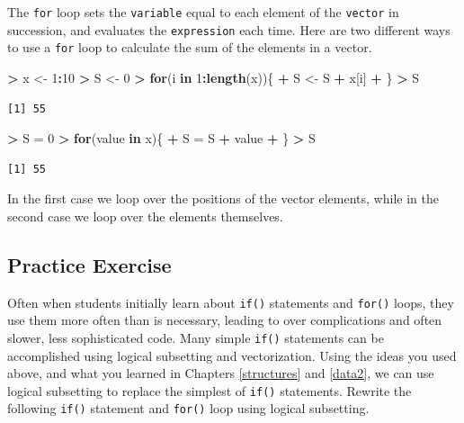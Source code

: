 \documentclass[]{krantz}
\makeatletter
\newenvironment{Shaded}{\begin{snugshade}}{\end{snugshade}}
\newcommand{\KeywordTok}[1]{\textcolor[rgb]{0.27,0.27,0.27}{\textbf{#1}}}
\newcommand{\DecValTok}[1]{\textcolor[rgb]{0.06,0.06,0.06}{#1}}
\newcommand{\StringTok}[1]{\textcolor[rgb]{0.5,0.5,0.5}{#1}}
\newcommand{\ControlFlowTok}[1]{\textcolor[rgb]{0.27,0.27,0.27}{\textbf{#1}}}
\newcommand{\OperatorTok}[1]{\textcolor[rgb]{0.43,0.43,0.43}{\textbf{#1}}}
\newcommand{\NormalTok}[1]{#1}
\newenvironment{kframe}{%
\medskip{}
\setlength{\fboxsep}{.8em}
 \def\at@end@of@kframe{}%
 \ifinner\ifhmode%
  \def\at@end@of@kframe{\end{minipage}}%
  \begin{minipage}{\columnwidth}%
 \fi\fi%
 \def\FrameCommand##1{\hskip\@totalleftmargin \hskip-\fboxsep
 \colorbox{shadecolor}{##1}\hskip-\fboxsep
     \hskip-\linewidth \hskip-\@totalleftmargin \hskip\columnwidth}%
 \MakeFramed {\advance\hsize-\width
   \@totalleftmargin\z@ \linewidth\hsize
   \@setminipage}}%
 {\par\unskip\endMakeFramed%
 \at@end@of@kframe}
\renewenvironment{Shaded}{\begin{kframe}}{\end{kframe}}
\makeatother
\begin{document}
The \texttt{for} loop sets the \texttt{variable} equal to each element
of the \texttt{vector} in succession, and evaluates the
\texttt{expression} each time. Here are two different ways to use a
\texttt{for} loop to calculate the sum of the elements in a vector.

\begin{Shaded}
\begin{Highlighting}[]
\OperatorTok{>}\StringTok{ }\NormalTok{x <-}\StringTok{ }\DecValTok{1}\OperatorTok{:}\DecValTok{10}
\OperatorTok{>}\StringTok{ }\NormalTok{S <-}\StringTok{ }\DecValTok{0}
\OperatorTok{>}\StringTok{ }\ControlFlowTok{for}\NormalTok{(i }\ControlFlowTok{in} \DecValTok{1}\OperatorTok{:}\KeywordTok{length}\NormalTok{(x))\{}
\OperatorTok{+}\StringTok{     }\NormalTok{S <-}\StringTok{ }\NormalTok{S }\OperatorTok{+}\StringTok{ }\NormalTok{x[i]}
\OperatorTok{+}\StringTok{ }\NormalTok{\}}
\OperatorTok{>}\StringTok{ }\NormalTok{S}
\end{Highlighting}
\end{Shaded}

\begin{verbatim}
[1] 55
\end{verbatim}

\begin{Shaded}
\begin{Highlighting}[]
\OperatorTok{>}\StringTok{ }\NormalTok{S =}\StringTok{ }\DecValTok{0}
\OperatorTok{>}\StringTok{ }\ControlFlowTok{for}\NormalTok{(value }\ControlFlowTok{in}\NormalTok{ x)\{}
\OperatorTok{+}\StringTok{   }\NormalTok{S =}\StringTok{ }\NormalTok{S }\OperatorTok{+}\StringTok{ }\NormalTok{value}
\OperatorTok{+}\StringTok{ }\NormalTok{\}}
\OperatorTok{>}\StringTok{ }\NormalTok{S}
\end{Highlighting}
\end{Shaded}

\begin{verbatim}
[1] 55
\end{verbatim}

In the first case we loop over the positions of the vector elements,
while in the second case we loop over the elements themselves.

\subsection{Practice Exercise}\label{practice-exercise-12}

Often when students initially learn about \texttt{if()} statements and
\texttt{for()} loops, they use them more often than is necessary,
leading to over complications and often slower, less sophisticated code.
Many simple \texttt{if()} statements can be accomplished using logical
subsetting and vectorization. Using the ideas you used above, and what
you learned in Chapters \ref{structures} and \ref{data2}, we can use
logical subsetting to replace the simplest of \texttt{if()} statements.
Rewrite the following \texttt{if()} statement and \texttt{for()} loop
using logical subsetting.
\end{document}
